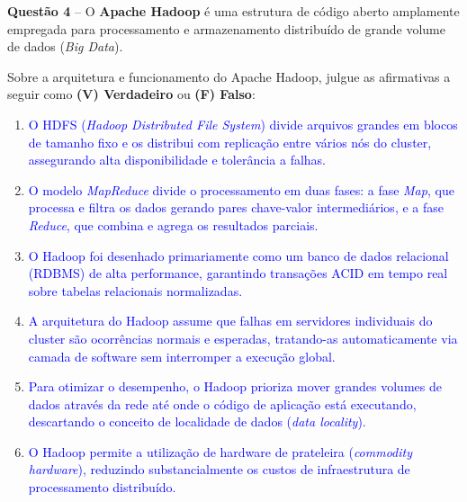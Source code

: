 \documentclass[12pt,a4paper]{article}
\begin{document}
\vspace{0.5cm}

\textbf{Questão 4} -- O \textbf{Apache Hadoop} é uma estrutura de código aberto amplamente empregada para processamento e armazenamento distribuído de grande volume de dados (\textit{Big Data}).

\vspace{0.2cm}

Sobre a arquitetura e funcionamento do Apache Hadoop, julgue as afirmativas a seguir como \textbf{(V) Verdadeiro} ou \textbf{(F) Falso}:

\vspace{0.3cm}

\begin{enumerate}[label=\textbf{(\hspace{0.6cm})} ,leftmargin=2cm]
    \item[\textcolor{blue}{\textbf{( V )}}] \textcolor{blue}{O HDFS (\textit{Hadoop Distributed File System}) divide arquivos grandes em blocos de tamanho fixo e os distribui com replicação entre vários nós do cluster, assegurando alta disponibilidade e tolerância a falhas.}

    \item[\textcolor{blue}{\textbf{( V )}}] \textcolor{blue}{O modelo \textit{MapReduce} divide o processamento em duas fases: a fase \textit{Map}, que processa e filtra os dados gerando pares chave-valor intermediários, e a fase \textit{Reduce}, que combina e agrega os resultados parciais.}

    \item[\textcolor{blue}{\textbf{( F )}}] \textcolor{blue}{O Hadoop foi desenhado primariamente como um banco de dados relacional (RDBMS) de alta performance, garantindo transações ACID em tempo real sobre tabelas relacionais normalizadas.}

    \item[\textcolor{blue}{\textbf{( V )}}] \textcolor{blue}{A arquitetura do Hadoop assume que falhas em servidores individuais do cluster são ocorrências normais e esperadas, tratando-as automaticamente via camada de software sem interromper a execução global.}

    \item[\textcolor{blue}{\textbf{( F )}}] \textcolor{blue}{Para otimizar o desempenho, o Hadoop prioriza mover grandes volumes de dados através da rede até onde o código de aplicação está executando, descartando o conceito de localidade de dados (\textit{data locality}).}

    \item[\textcolor{blue}{\textbf{( V )}}] \textcolor{blue}{O Hadoop permite a utilização de hardware de prateleira (\textit{commodity hardware}), reduzindo substancialmente os custos de infraestrutura de processamento distribuído.}
\end{enumerate}
\end{document}
